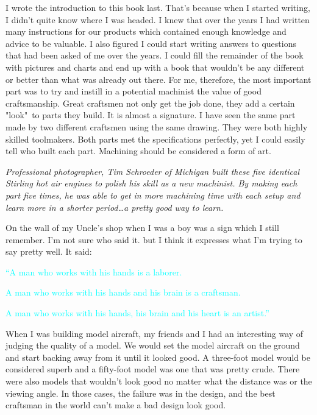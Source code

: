 \secdown{}\secdown


I wrote the introduction to this book last. That's because when I started
writing, I didn't quite know where I was headed. I knew that over the years I
had written many instructions for our products which contained enough knowledge
and advice to be valuable. I also figured I could start writing answers to
questions that had been asked of me over the years. I could fill the remainder
of the book with pictures and charts and end up with a book that wouldn't be any
different or better than what was already out there. For me, therefore, the most
important part was to try and instill in a potential machinist the value of good
craftsmanship. Great craftsmen not only get the job done, they add a certain
"look"\ to parts they build. It is almost a signature. I have seen the same part
made by two different craftsmen using the same drawing. They were both highly
skilled toolmakers. Both parts met the specifications perfectly, yet I could
easily tell who built each part. Machining should be considered a form of art.


\bigskip\textit{Professional photographer, Tim Schroeder of Michigan built these
five identical Stirling hot air engines to polish his skill as a new machinist.
By making each part five times, he was able to get in more machining time with
each setup and learn more in a shorter period\ldots a pretty good way to
learn.}\bigskip

On the wall of my Uncle's shop when I was a boy was a sign which I still
remember. I'm not sure who said it. but I think it expresses what I'm trying to
say pretty well. It said:


\bigskip
\textcolor{Cyan}{``A man who works with his hands is a laborer.}

\bigskip
\textcolor{Cyan}{A man who works with his hands and his brain is a craftsman.}

\bigskip
\textcolor{Cyan}{A man who works with his hands, his brain and his heart is an
artist.''}
\bigskip

When I was building model aircraft, my friends and I had an interesting way of
judging the quality of a model. We would set the model aircraft on the ground
and start backing away from it until it looked good. A three-foot model would be
considered superb and a fifty-foot model was one that was pretty crude. There
were also models that wouldn't look good no matter what the distance was or the
viewing angle. In those cases, the failure was in the design, and the best
craftsman in the world can't make a bad design look good.

